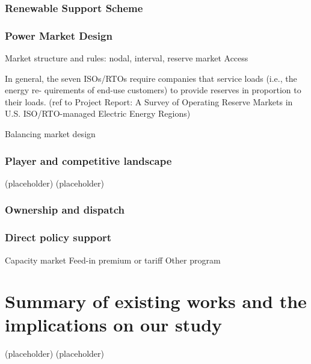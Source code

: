 \subsubsection{Renewable Support Scheme}

\subsubsection{Power Market Design}
Market structure and rules: nodal, interval, reserve market
Access

In general, the seven ISOs/RTOs require companies that service loads (i.e., the energy re- quirements of end-use customers) to provide reserves in proportion to their loads. (ref to Project Report: A Survey of Operating Reserve Markets in U.S. ISO/RTO-managed Electric Energy Regions)

Balancing market design \cite{Wartsila2014} \cite{Moller2010}

\subsubsection{Player and competitive landscape}
(placeholder)
\newpage
(placeholder)
\newpage
\subsubsection{Ownership and dispatch}

\subsubsection{Direct policy support}
Capacity market
Feed-in premium or tariff
Other program

\section{Summary of existing works and the implications on our study}

(placeholder)
\newpage
(placeholder)
\newpage